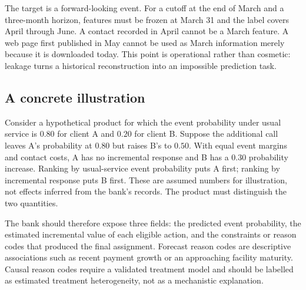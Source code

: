 The target is a forward-looking event. For a cutoff at the end of March and a three-month horizon, features must be frozen at March 31 and the label covers April through June. A contact recorded in April cannot be a March feature. A web page first published in May cannot be used as March information merely because it is downloaded today. This point is operational rather than cosmetic: leakage turns a historical reconstruction into an impossible prediction task.

\subsection{A concrete illustration}

Consider a hypothetical product for which the event probability under usual service is $0.80$ for client A and $0.20$ for client B. Suppose the additional call leaves A's probability at $0.80$ but raises B's to $0.50$. With equal event margins and contact costs, A has no incremental response and B has a $0.30$ probability increase. Ranking by usual-service event probability puts A first; ranking by incremental response puts B first. These are assumed numbers for illustration, not effects inferred from the bank's records. The product must distinguish the two quantities.

The bank should therefore expose three fields: the predicted event probability, the estimated incremental value of each eligible action, and the constraints or reason codes that produced the final assignment. Forecast reason codes are descriptive associations such as recent payment growth or an approaching facility maturity. Causal reason codes require a validated treatment model and should be labelled as estimated treatment heterogeneity, not as a mechanistic explanation.

